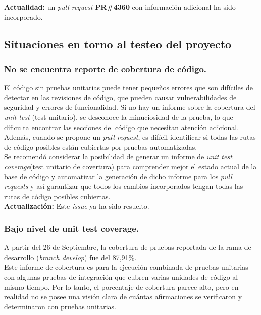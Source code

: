 \textbf{Actualidad:} un \textit{pull request} \textbf{PR\#4360}\cite{GHPR4360} con información adicional ha sido incorporado.\\

\subsection{Situaciones en torno al testeo del proyecto}

\subsubsection{No se encuentra reporte de cobertura de código.}

El código sin pruebas unitarias puede tener pequeños errores que son difíciles de detectar en las revisiones de código, que pueden causar vulnerabilidades de seguridad y errores de funcionalidad. Si no hay un informe sobre la cobertura del \textit{unit test} (test unitario), se desconoce la minuciosidad de la prueba, lo que dificulta encontrar las secciones del código que necesitan atención adicional. Además, cuando se propone un \textit{pull request}, es difícil identificar si todas las rutas de código posibles están cubiertas por pruebas automatizadas.\\

Se recomendó considerar la posibilidad de generar un informe de \textit{unit test coverage}(test unitario de covertura) para comprender mejor el estado actual de la base de código y automatizar la generación de dicho informe para los \textit{pull requests} y así garantizar que todos los cambios incorporados tengan todas las rutas de código posibles cubiertas.\\

\textbf{Actualización:} Este \textit{issue}\cite{GHI2663} ya ha sido resuelto.\\

\subsubsection{Bajo nivel de unit test coverage.}

A partir del 26 de Septiembre, la cobertura de pruebas reportada de la rama de desarrollo (\textit{branch develop})\cite{CodeCovEthereumSolidityOld} fue del 87,91\%.\\

Este informe de cobertura es para la ejecución combinada de pruebas unitarias con algunas pruebas de integración que cubren varias unidades de código al mismo tiempo. Por lo tanto, el porcentaje de cobertura parece alto, pero en realidad no se posee una visión clara de cuántas afirmaciones se verificaron y determinaron con pruebas unitarias.\\

